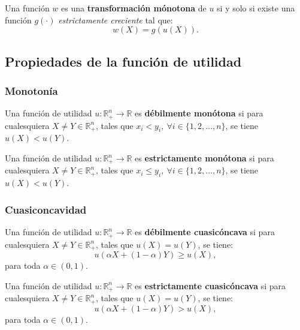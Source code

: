 \documentclass[8pt,a4paper]{extarticle}
\begin{document}
\begin{multicols}{3}
\begin{boxdef}
Una función $w$ es una \textbf{transformación mónotona} de $u$ si y solo si existe una función $g(\cdot)$ \emph{estrictamente creciente} tal que:
	\[
		w(X) = g(u(X))
	.\] 
\end{boxdef}

\sectionbreak

\subsection{Propiedades de la función de utilidad}

\subsubsection*{Monotonía}

\begin{boxdef}
	Una función de utilidad $u : \mathbb{R}^n_+ \to \mathbb{R}$ es \textbf{débilmente monótona} si para cualesquiera $X \neq Y \in \mathbb{R}^n_+$, tales que $x_i < y_i,\ \forall i \in \{1, 2, \ldots, n\}$, se tiene $u(X) < u(Y)$.
\end{boxdef}

\begin{boxdef}
	Una función de utilidad $u : \mathbb{R}^n_+ \to \mathbb{R}$ es \textbf{estrictamente monótona} si para cualesquiera $X \neq Y \in \mathbb{R}^n_+$, tales que $x_i \le y_i,\ \forall i \in \{ 1, 2, \ldots, n \}$, se tiene $u(X) < u(Y)$.
\end{boxdef}

\subsubsection*{Cuasiconcavidad}

\begin{boxdef}
	Una función de utilidad $u : \mathbb{R}^n_+ \to \mathbb{R}$ es \textbf{débilmente cuasicóncava} si para cualesquiera $X \neq Y \in \mathbb{R}^n_+$, tales que $u(X) = u(Y)$, se tiene:
	\[
		u(\alpha X + (1 - \alpha)Y) \ge u(X)
	,\] 
	para toda $\alpha \in (0, 1)$.
\end{boxdef}

\begin{boxdef}
	Una función de utilidad $u : \mathbb{R}^n_+ \to \mathbb{R}$ es \textbf{estrictamente cuasicóncava} si para cualesquiera $X \neq Y \in \mathbb{R}^n_+$, tales que $u(X) = u(Y)$, se tiene:
	\[
		u(\alpha X + (1 - \alpha)Y) > u(X)
	,\] 
	para toda $\alpha \in (0, 1)$.
\end{boxdef}


\end{multicols}
\end{document}
